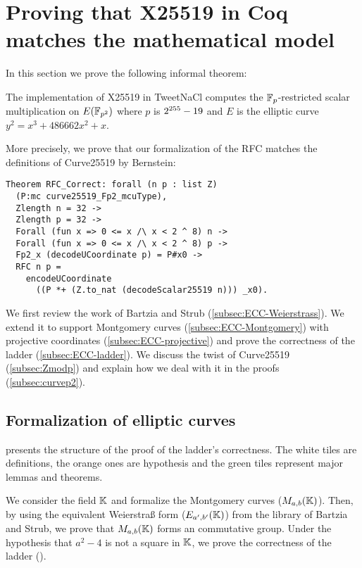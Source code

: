 \section{Proving that X25519 in Coq matches the mathematical model}
\label{sec:maths}

In this section we prove the following informal theorem:

\begin{informaltheorem}
  The implementation of X25519 in TweetNaCl computes the
  $\mathbb{F}_{p}$-restricted \xcoord scalar multiplication on $E(\mathbb{F}_{p^2})$ where $p$ is $2^{255}-19$
  and $E$ is the elliptic curve $y^2 = x^3 + 486662 x^2 + x$.
\end{informaltheorem}

More precisely, we prove that our formalization of the RFC matches the definitions of Curve25519 by Bernstein:
\begin{lstlisting}[language=Coq]
Theorem RFC_Correct: forall (n p : list Z)
  (P:mc curve25519_Fp2_mcuType),
  Zlength n = 32 ->
  Zlength p = 32 ->
  Forall (fun x => 0 <= x /\ x < 2 ^ 8) n ->
  Forall (fun x => 0 <= x /\ x < 2 ^ 8) p ->
  Fp2_x (decodeUCoordinate p) = P#x0 ->
  RFC n p =
    encodeUCoordinate
      ((P *+ (Z.to_nat (decodeScalar25519 n))) _x0).
\end{lstlisting}

We first review the work of Bartzia and Strub \cite{BartziaS14} (\ref{subsec:ECC-Weierstrass}).
We extend it to support Montgomery curves (\ref{subsec:ECC-Montgomery})
with projective coordinates (\ref{subsec:ECC-projective}) and prove the
correctness of the ladder (\ref{subsec:ECC-ladder}).
We discuss the twist of Curve25519 (\ref{subsec:Zmodp}) and explain how we deal
with it in the proofs (\ref{subsec:curvep2}).

\subsection{Formalization of elliptic curves}
\label{subsec:ECC}

 presents the structure of the proof of the ladder's
correctness. The white tiles are definitions, the orange ones are hypothesis and
the green tiles represent major lemmas and theorems.

We consider the field $\mathbb{K}$ and formalize the Montgomery curves ($M_{a,b}(\mathbb{K})$).
Then, by using the equivalent Weierstra{\ss} form ($E_{a',b'}(\mathbb{K})$) from the library of Bartzia and Strub,
we prove that $M_{a,b}(\mathbb{K})$ forms an commutative group.
Under the hypothesis that
$a^2 - 4$ is not a square in $\mathbb{K}$, we prove the correctness of the ladder ().

